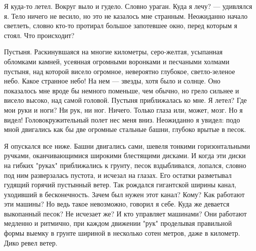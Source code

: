\bigskip{}



Я куда-то летел. Вокруг выло и гудело. Словно ураган. Куда  я  лечу?  ---
удивлялся я. Тело ничего не весило,  но  это  не  казалось  мне  странным.
Неожиданно начало светлеть,  словно  кто-то  протирал  большое  запотевшее
окно, перед которым я стоял. Что происходит?

Пустыня. Раскинувшаяся  на  многие  километры,  серо-желтая,  усыпанная
обломками  камней,  усеянная  огромными  воронками  и  песчаными   холмами
пустыня, над которой висело огромное, невероятно глубокое,  светло-зеленое
небо. Какое странное небо! На нем  ---  звезды,  хотя  было  и  солнце.  Оно
показалось мне вроде бы немного поменьше, чем обычно, но грело  сильнее  и
висело высоко, над самой головой. Пустыня приближалась ко  мне.  Я  летел?
Где мои руки и ноги? Ни рук, ни ног.  Ничего.  Только  глаза  или,  может,
мозг. Но я видел! Головокружительный полет нес  меня  вниз.  Неожиданно  я
увидел: подо мной двигались как бы две огромные  стальные  башни,  глубоко
врытые в песок.

Я  опускался  все  ниже.   Башни   двигались   сами,   шевеля   тонкими
горизонтальными ручками, оканчивающимися широкими  блестящими  дисками.  И
когда  эти  диски  на  гибких  "руках"  приближались   к   грунту,   песок
вздыбливался, лопался, словно под ним разверзалась пустота, и  исчезал  на
глазах. Его  остатки  разметывал  гудящий  горячий  пустынный  ветер.  Так
рождался гигантской ширины канал, уходивший  в  бесконечность.  Зачем  был
нужен этот канал? Кому? Как работают эти машины? Но ведь такое невозможно,
говорил я себе. Куда же девается выкопанный песок? Не исчезает же?  И  кто
управляет машинами? Они работают медленно и ритмично, при каждом  движении
"рук" проделывая правильной формы выемку  в  грунте  шириной  в  несколько
сотен метров, даже в километр. Дико ревел ветер.

